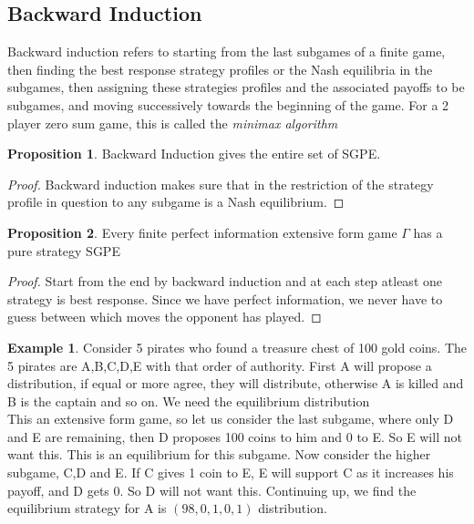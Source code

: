 \documentclass{article}
\theoremstyle{definition}
\newtheorem{prop}{Proposition}[section]
\newtheorem{example}{Example}[section]
\begin{document}
\subsection{Backward Induction}
Backward induction refers to starting from the last subgames of a finite game, then finding the best response strategy profiles or the Nash equilibria in the subgames, then assigning these strategies profiles and the associated payoffs to be subgames, and moving successively towards the beginning of the game. For a 2 player zero sum game, this is called the \textit{minimax algorithm}
\begin{prop}
Backward Induction gives the entire set of SGPE.
\end{prop}
\begin{proof}
Backward induction makes sure that in the restriction of the strategy profile in question to any subgame is a Nash equilibrium.
\end{proof}
\begin{prop}
Every finite perfect information extensive form game $\Gamma$ has a pure strategy SGPE
\end{prop}
\begin{proof}
Start from the end by backward induction and at each step atleast one strategy is best response. Since we have perfect information, we never have to guess between which moves the opponent has played.
\end{proof}
\begin{example} 
Consider 5 pirates who found a treasure chest of 100 gold coins. The 5 pirates are A,B,C,D,E with that order of authority. First A will propose a distribution, if equal or more agree, they will distribute, otherwise A is killed and B is the captain and so on. We need the equilibrium distribution\\

This an extensive form game, so let us consider the last subgame, where only D and E are remaining, then D proposes 100 coins to him and 0 to E. So E will not want this. This is an equilibrium for this subgame. Now consider the higher subgame, C,D and E. If C gives 1 coin to E, E will support C as it increases his payoff, and D gets 0. So D will not want this. Continuing up, we find the equilibrium strategy for A is $(98,0,1,0,1)$ distribution.
\end{example}
\end{document}
